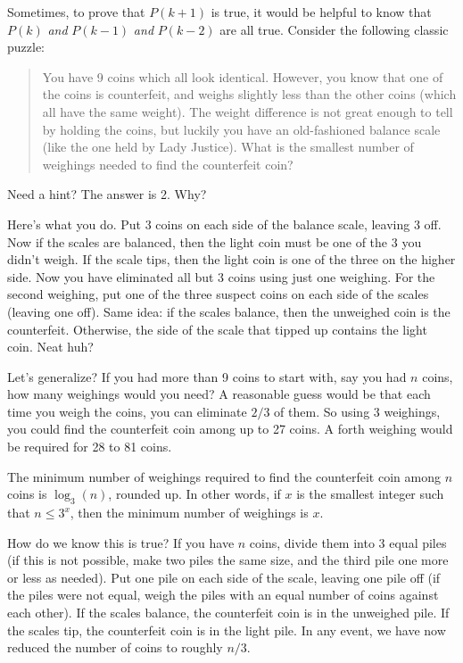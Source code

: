 \documentclass[12pt]{article}
\begin{document}
Sometimes, to prove that $P(k+1)$ is true, it would be helpful to know that $P(k)$ \emph{and} $P(k-1)$ \emph{and} $P(k-2)$ are all true.  Consider the following classic puzzle:

\begin{quote}
	You have 9 coins which all look identical.  However, you know that one of the coins is counterfeit, and weighs slightly less than the other coins (which all have the same weight).  The weight difference is not great enough to tell by holding the coins, but luckily you have an old-fashioned balance scale (like the one held by Lady Justice).  What is the smallest number of weighings needed to find the counterfeit coin?
\end{quote}

Need a hint?  The answer is 2.  Why?

Here's what you do.  Put 3 coins on each side of the balance scale, leaving 3 off.  Now if the scales are balanced, then the light coin must be one of the 3 you didn't weigh.  If the scale tips, then the light coin is one of the three on the higher side.  Now you have eliminated all but 3 coins using just one weighing.  For the second weighing, put one of the three suspect coins on each side of the scales (leaving one off).  Same idea: if the scales balance, then the unweighed coin is the counterfeit.  Otherwise, the side of the scale that tipped up contains the light coin.  Neat huh?

Let's generalize?  If you had more than 9 coins to start with, say you had $n$ coins, how many weighings would you need?  A reasonable guess would be that each time you weigh the coins, you can eliminate $2/3$ of them.  So using 3 weighings, you could find the counterfeit coin among up to 27 coins.  A forth weighing would be required for 28 to 81 coins.

\begin{conjecture}
	The minimum number of weighings required to find the counterfeit coin among $n$ coins is $\log_3(n)$, rounded up.  In other words, if $x$ is the smallest integer such that $n \le 3^x$, then the minimum number of weighings is $x$.
\end{conjecture}

How do we know this is true?  If you have $n$ coins, divide them into 3 equal piles (if this is not possible, make two piles the same size, and the third pile one more or less as needed).  Put one pile on each side of the scale, leaving one pile off (if the piles were not equal, weigh the piles with an equal number of coins against each other).  If the scales balance, the counterfeit coin is in the unweighed pile.  If the scales tip, the counterfeit coin is in the light pile.  In any event, we have now reduced the number of coins to roughly $n/3$.
\end{document}
